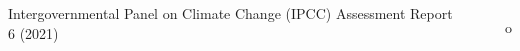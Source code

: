 

\begin{frame}
  \begin{small}
              
  \begin{columns}
  {\cb Intergovernmental Panel on Climate Change (IPCC) Assessment Report 6 (2021)}
    \begin{itemize}\setlength\itemsep{1.0ex}\footnotesize
      \item[o]  
    \end{itemize}
  \end{columns}

  \end{small}
\end{frame}   

